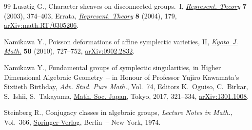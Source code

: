 \documentclass[11pt]{article}
\numberwithin{equation}{section}
\numberwithin{equation}{section}
\begin{document}
\begin{thebibliography}{99}
Lusztig G., Character sheaves on disconnected groups.~{I}, \href{https://doi.org/10.1090/S1088-4165-03-00204-8}{\textit{Represent.
 Theory}} \textbf{7} (2003), 374--403, {E}rrata,
 \href{https://doi.org/10.1090/S1088-4165-04-00247-X}{\textit{Represent.
 Theory}} \textbf{8} (2004), 179, \href{https://arxiv.org/abs/math.RT/0305206}{arXiv:math.RT/0305206}.

Namikawa Y., Poisson deformations of affine symplectic varieties, {II},
 \href{https://doi.org/10.1215/0023608X-2010-012}{\textit{Kyoto~J. Math.}} \textbf{50} (2010), 727--752, \href{https://arxiv.org/abs/0902.2832}{arXiv:0902.2832}.

Namikawa Y., Fundamental groups of symplectic singularities, in Higher
 Dimensional Algebraic Geometry~-- in Honour of {P}rofessor {Y}ujiro
 {K}awamata's Sixtieth Birthday, \textit{Adv. Stud. Pure Math.}, Vol.~74,
 Editors K.~Oguiso, C.~Birkar, S.~Ishii, S.~Takayama, \href{https://doi.org/10.2969/aspm/07410321}{Math. Soc. Japan}, Tokyo,
 2017, 321--334, \href{https://arxiv.org/abs/1301.1008}{arXiv:1301.1008}.

Steinberg R., Conjugacy classes in algebraic groups, \textit{Lecture Notes in
 Math.}, Vol.~366, \href{https://doi.org/10.1007/BFb0067854}{Springer-Verlag}, Berlin~-- New York, 1974.

\end{thebibliography}
\end{document}

